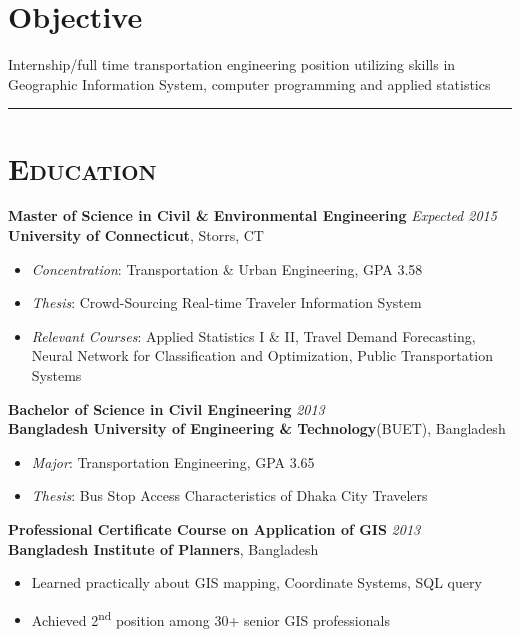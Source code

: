 \documentclass[margin]{res}%
\begin{document}
\vspace{-0.65em}
\begin{resume} 
 \section{Objective} Internship/full time transportation engineering position utilizing skills in Geographic Information System, computer programming and applied statistics


\vspace{-1.9em}
\noindent\rule{\textwidth}{0.4pt}
\vspace{-1.85em}

\section{\textsc {Education}}
{\bf Master of Science in Civil \& Environmental Engineering} \hfill \emph{Expected 2015} \\
{\bf  University of Connecticut}, Storrs, CT
\begin{itemize}\itemsep -2.25pt  %
\item \emph{Concentration}: Transportation \& Urban Engineering, GPA 3.58
\item \emph{Thesis}: Crowd-Sourcing Real-time Traveler Information System
\item \emph{Relevant Courses}: Applied Statistics I \& II, Travel Demand Forecasting,\\ Neural Network for Classification and Optimization, Public Transportation Systems
\end{itemize} 
\vspace{-0.85em} 


{\bf Bachelor of Science in Civil Engineering} \hfill \emph{2013}\\
{\bf Bangladesh University of Engineering \& Technology}(BUET), Bangladesh
\begin{itemize}\itemsep -2.25pt  %
\item \emph{Major}: Transportation Engineering, GPA 3.65
\item \emph{Thesis}: Bus Stop Access Characteristics of Dhaka City Travelers
\end{itemize}
\vspace{-0.85em}


{\bf Professional Certificate Course on Application of GIS} \hfill \emph{2013}\\
{\bf Bangladesh Institute of Planners}, Bangladesh
\begin{itemize}\itemsep -2.25pt  %
\item Learned practically about GIS mapping, Coordinate Systems, SQL query
\item Achieved 2\textsuperscript{nd} position among 30+ senior GIS professionals
\end{itemize}



\end{resume}
\end{document}
